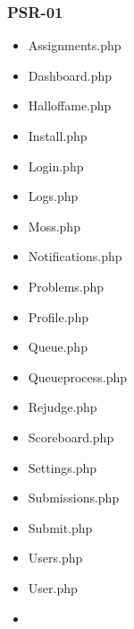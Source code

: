 \subsubsection{PSR-01}
\begin{itemize}
	\item Assignments.php
	\item Dashboard.php
	\item Halloffame.php
	\item Install.php
	\item Login.php
	\item Logs.php
	\item Moss.php
	\item Notifications.php
	\item Problems.php
	\item Profile.php
	\item Queue.php
	\item Queueprocess.php
	\item Rejudge.php
	\item Scoreboard.php
	\item Settings.php
	\item Submissions.php
	\item Submit.php
	\item Users.php
	\item User.php
	\item 
\end{itemize}

